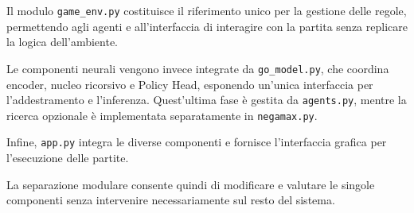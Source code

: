 Il modulo \texttt{game\_env.py} costituisce il riferimento unico per la gestione delle regole, permettendo agli agenti e all'interfaccia di interagire con la partita senza replicare la logica dell'ambiente.

Le componenti neurali vengono invece integrate da \texttt{go\_model.py}, che coordina encoder, nucleo ricorsivo e Policy Head, esponendo un'unica interfaccia per l'addestramento e l'inferenza. Quest'ultima fase è gestita da \texttt{agents.py}, mentre la ricerca opzionale è implementata separatamente in \texttt{negamax.py}.

Infine, \texttt{app.py} integra le diverse componenti e fornisce l'interfaccia grafica per l'esecuzione delle partite.

La separazione modulare consente quindi di modificare e valutare le singole componenti senza intervenire necessariamente sul resto del sistema.
